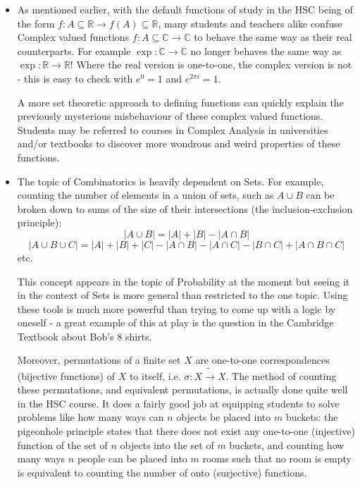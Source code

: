 \documentclass[11pt, a4paper, oneside]{article}
\begin{document}
\begin{itemize}
  \item As mentioned earlier, with the default functions of study in the HSC being of the form $f: A \subseteq \mathbb{R} \rightarrow f(A) \subseteq \mathbb{R}$, many students and teachers alike confuse Complex valued functions $f: A \subseteq \mathbb{C} \rightarrow \mathbb{C}$ to behave the same way as their real counterparts. For example $\exp: \mathbb{C} \rightarrow \mathbb{C}$ no longer behaves the same way as $\exp: \mathbb{R} \rightarrow \mathbb{R}$! Where the real version is one-to-one, the complex version is not - this is easy to check with $e^0 = 1$ and $e^{2\pi i} = 1$.

    A more set theoretic approach to defining functions can quickly explain the previously mysterious misbehaviour of these complex valued functions. Students may be referred to courses in Complex Analysis in universities and/or textbooks to discover more wondrous and weird properties of these functions.

  \item The topic of Combinatorics is heavily dependent on Sets. For example, counting the number of elements in a union of sets, such as $A \cup B$ can be broken down to sums of the size of their intersections (the inclusion-exclusion principle):
    \[ |A \cup B| = |A| + |B| - |A \cap B| \]
    \[ |A \cup B \cup C| = |A| + |B| + |C| - |A \cap B| - |A \cap C| - |B\cap C| + |A \cap B \cap C| \]
    etc.

    This concept appears in the topic of Probability at the moment but seeing it in the context of Sets is more general than restricted to the one topic. Using these tools is much more powerful than trying to come up with a logic by oneself - a great example of this at play is the question in the Cambridge Textbook about Bob's 8 shirts.

    Moreover, permutations of a finite set $X$ are one-to-one correspondences (bijective functions) of $X$ to itself, i.e. $\sigma: X \tilde{\rightarrow} X$. The method of counting these permutations, and equivalent permutations, is actually done quite well in the HSC course. It does a fairly good job at equipping students to solve problems like how many ways can $n$ objects be placed into $m$ buckets: the pigeonhole principle states that there does not exist any one-to-one (injective) function of the set of $n$ objects into the set of $m$ buckets, and counting how many ways $n$ people can be placed into $m$ rooms such that no room is empty is equivalent to counting the number of onto (surjective) functions.
\end{itemize}
\end{document}
